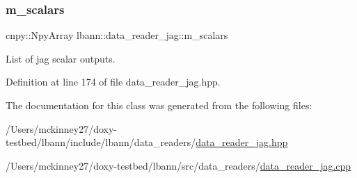 \subsubsection{\texorpdfstring{m\+\_\+scalars}{m\_scalars}}
{\footnotesize\ttfamily cnpy\+::\+Npy\+Array lbann\+::data\+\_\+reader\+\_\+jag\+::m\+\_\+scalars\hspace{0.3cm}{\ttfamily [protected]}}



List of jag scalar outputs. 



Definition at line 174 of file data\+\_\+reader\+\_\+jag.\+hpp.



The documentation for this class was generated from the following files\+:\begin{DoxyCompactItemize}
\item 
/\+Users/mckinney27/doxy-\/testbed/lbann/include/lbann/data\+\_\+readers/\hyperlink{data__reader__jag_8hpp}{data\+\_\+reader\+\_\+jag.\+hpp}\item 
/\+Users/mckinney27/doxy-\/testbed/lbann/src/data\+\_\+readers/\hyperlink{data__reader__jag_8cpp}{data\+\_\+reader\+\_\+jag.\+cpp}\end{DoxyCompactItemize}
